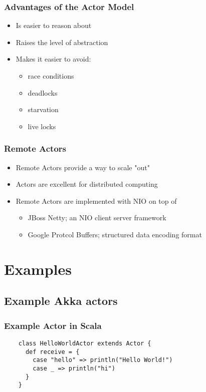 \documentclass{beamer}
\begin{document}
\frame
    {
      \frametitle{Advantages of the Actor Model}
      \begin{itemize}
      \item Is easier to reason about
      \item Raises the level of abstraction
      \item Makes it easier to avoid:
        \begin{itemize}
        \item race conditions
        \item deadlocks
        \item starvation
        \item live locks
        \end{itemize}
      \end{itemize}
    }



\frame
{
  \frametitle{Remote Actors}
  \begin{itemize}
  \item Remote Actors provide a way to scale "out"
  \item Actors are excellent for distributed computing
  \item Remote Actors are implemented with NIO on top of
    \begin{itemize}
    \item JBoss Netty; an NIO client server framework
    \item Google Protcol Buffers; structured data encoding format
    \end{itemize}
  \end{itemize}
}


\section{Examples}
\subsection{Example Akka actors}

\begin{frame}[fragile]
  \frametitle{Example Actor in Scala}

  \begin{lstlisting}
    class HelloWorldActor extends Actor {
      def receive = {
        case "hello" => println("Hello World!")
        case _ => println("hi")
      }
    }
  \end{lstlisting}
\end{frame}
\end{document}
